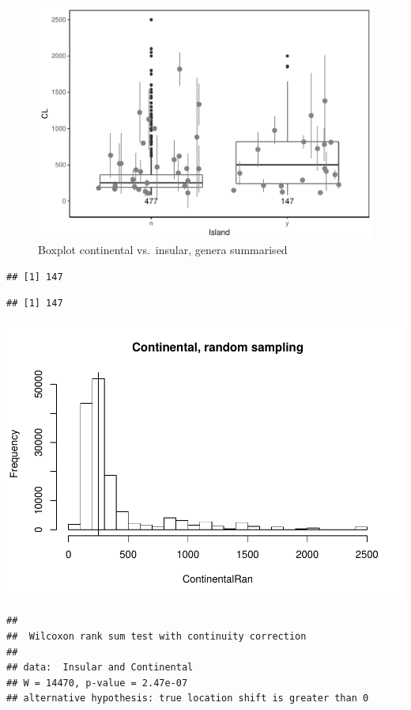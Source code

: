 \documentclass[]{article}
\begin{document}
\begin{figure}[htbp]
\centering
\includegraphics{MA_JJ_files/figure-latex/Boxplot continental vs. insular-1.pdf}
\caption{Boxplot continental vs.~insular, genera summarised}
\end{figure}

\begin{verbatim}
## [1] 147
\end{verbatim}

\begin{verbatim}
## [1] 147
\end{verbatim}

\includegraphics{MA_JJ_files/figure-latex/randon sampling island continental-1.pdf}

\begin{verbatim}
## 
##  Wilcoxon rank sum test with continuity correction
## 
## data:  Insular and Continental
## W = 14470, p-value = 2.47e-07
## alternative hypothesis: true location shift is greater than 0
\end{verbatim}
\end{document}
